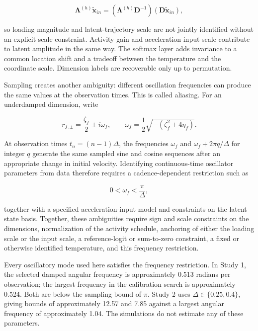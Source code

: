 \documentclass[
]{article}
\begin{document}
\[
\boldsymbol{\Lambda}^{(h)}\tilde{\mathbf{x}}_{in}
=(\boldsymbol{\Lambda}^{(h)}\mathbf{D}^{-1})(\mathbf{D}\tilde{\mathbf{x}}_{in}),
\]

so loading magnitude and latent-trajectory scale are not jointly
identified without an explicit scale constraint. Activity gain and
acceleration-input scale contribute to latent amplitude in the same way.
The softmax layer adds invariance to a common location shift and a
tradeoff between the temperature and the coordinate scale. Dimension
labels are recoverable only up to permutation.

Sampling creates another ambiguity: different oscillation frequencies
can produce the same values at the observation times. This is called
aliasing. For an underdamped dimension, write

\[
r_{f,\pm}=\frac{\zeta_f}{2}\pm i\omega_f,
\qquad
\omega_f=
\frac{1}{2}\sqrt{-(\zeta_f^2+4\eta_f)}.
\]

At observation times \(t_n=(n-1)\Delta\), the frequencies \(\omega_f\)
and \(\omega_f+2\pi q/\Delta\) for integer \(q\) generate the same
sampled sine and cosine sequences after an appropriate change in initial
velocity. Identifying continuous-time oscillator parameters from data
therefore requires a cadence-dependent restriction such as

\[
0<\omega_f<\frac{\pi}{\Delta},
\]

together with a specified acceleration-input model and constraints on
the latent state basis. Together, these ambiguities require sign and
scale constraints on the dimensions, normalization of the activity
schedule, anchoring of either the loading scale or the input scale, a
reference-logit or sum-to-zero constraint, a fixed or otherwise
identified temperature, and this frequency restriction.

Every oscillatory mode used here satisfies the frequency restriction. In
Study 1, the selected damped angular frequency is approximately 0.513
radians per observation; the largest frequency in the calibration search
is approximately 0.524. Both are below the sampling bound of \(\pi\).
Study 2 uses \(\Delta\in\{0.25,0.4\}\), giving bounds of approximately
12.57 and 7.85 against a largest angular frequency of approximately
1.04. The simulations do not estimate any of these parameters.

\newpage

\setcounter{table}{0}
\renewcommand{\thetable}{B\arabic{table}}
\setcounter{figure}{0}
\renewcommand{\thefigure}{B\arabic{figure}}
\end{document}
